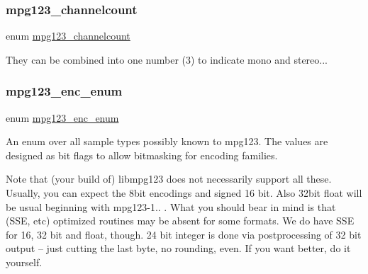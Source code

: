 \subsubsection{\texorpdfstring{mpg123\+\_\+channelcount}{mpg123\_channelcount}\hspace{0.1cm}{\footnotesize\ttfamily [2/2]}}
{\footnotesize\ttfamily enum \hyperlink{group__mpg123__output_ga94df916cae2fc81b8a6df88c1728eb1c}{mpg123\+\_\+channelcount}}

They can be combined into one number (3) to indicate mono and stereo... \mbox{\label{group__mpg123__output_gafc8cdd60a8d3c30a09249869d835c634}} 
\subsubsection{\texorpdfstring{mpg123\+\_\+enc\+\_\+enum}{mpg123\_enc\_enum}\hspace{0.1cm}{\footnotesize\ttfamily [1/2]}}
{\footnotesize\ttfamily enum \hyperlink{group__mpg123__output_gafc8cdd60a8d3c30a09249869d835c634}{mpg123\+\_\+enc\+\_\+enum}}

An enum over all sample types possibly known to mpg123. The values are designed as bit flags to allow bitmasking for encoding families.

Note that (your build of) libmpg123 does not necessarily support all these. Usually, you can expect the 8bit encodings and signed 16 bit. Also 32bit float will be usual beginning with mpg123-\/1.. . What you should bear in mind is that (S\+SE, etc) optimized routines may be absent for some formats. We do have S\+SE for 16, 32 bit and float, though. 24 bit integer is done via postprocessing of 32 bit output -- just cutting the last byte, no rounding, even. If you want better, do it yourself.


